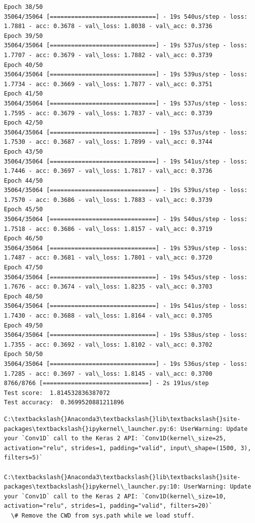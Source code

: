 \documentclass[11pt]{article}
\begin{document}
\begin{Verbatim}[commandchars=\\\{\}]
Epoch 38/50
35064/35064 [==============================] - 19s 540us/step - loss: 1.7881 - acc: 0.3678 - val\_loss: 1.8038 - val\_acc: 0.3736
Epoch 39/50
35064/35064 [==============================] - 19s 537us/step - loss: 1.7707 - acc: 0.3679 - val\_loss: 1.7882 - val\_acc: 0.3739
Epoch 40/50
35064/35064 [==============================] - 19s 539us/step - loss: 1.7734 - acc: 0.3669 - val\_loss: 1.7877 - val\_acc: 0.3751
Epoch 41/50
35064/35064 [==============================] - 19s 537us/step - loss: 1.7595 - acc: 0.3679 - val\_loss: 1.7837 - val\_acc: 0.3739
Epoch 42/50
35064/35064 [==============================] - 19s 537us/step - loss: 1.7530 - acc: 0.3687 - val\_loss: 1.7899 - val\_acc: 0.3744
Epoch 43/50
35064/35064 [==============================] - 19s 541us/step - loss: 1.7446 - acc: 0.3697 - val\_loss: 1.7817 - val\_acc: 0.3736
Epoch 44/50
35064/35064 [==============================] - 19s 539us/step - loss: 1.7570 - acc: 0.3686 - val\_loss: 1.7883 - val\_acc: 0.3739
Epoch 45/50
35064/35064 [==============================] - 19s 540us/step - loss: 1.7518 - acc: 0.3686 - val\_loss: 1.8157 - val\_acc: 0.3719
Epoch 46/50
35064/35064 [==============================] - 19s 539us/step - loss: 1.7487 - acc: 0.3681 - val\_loss: 1.7801 - val\_acc: 0.3720
Epoch 47/50
35064/35064 [==============================] - 19s 545us/step - loss: 1.7676 - acc: 0.3674 - val\_loss: 1.8235 - val\_acc: 0.3703
Epoch 48/50
35064/35064 [==============================] - 19s 541us/step - loss: 1.7430 - acc: 0.3688 - val\_loss: 1.8164 - val\_acc: 0.3705
Epoch 49/50
35064/35064 [==============================] - 19s 538us/step - loss: 1.7355 - acc: 0.3692 - val\_loss: 1.8102 - val\_acc: 0.3702
Epoch 50/50
35064/35064 [==============================] - 19s 536us/step - loss: 1.7285 - acc: 0.3697 - val\_loss: 1.8145 - val\_acc: 0.3700
8766/8766 [==============================] - 2s 191us/step
Test score:  1.814532836387072
Test accuracy:  0.3699520881211896

    \end{Verbatim}

    \begin{Verbatim}[commandchars=\\\{\}]
C:\textbackslash{}Anaconda3\textbackslash{}lib\textbackslash{}site-packages\textbackslash{}ipykernel\_launcher.py:6: UserWarning: Update your `Conv1D` call to the Keras 2 API: `Conv1D(kernel\_size=25, activation="relu", strides=1, padding="valid", input\_shape=(1500, 3), filters=5)`
  
C:\textbackslash{}Anaconda3\textbackslash{}lib\textbackslash{}site-packages\textbackslash{}ipykernel\_launcher.py:10: UserWarning: Update your `Conv1D` call to the Keras 2 API: `Conv1D(kernel\_size=10, activation="relu", strides=1, padding="valid", filters=20)`
  \# Remove the CWD from sys.path while we load stuff.

    \end{Verbatim}
\end{document}
